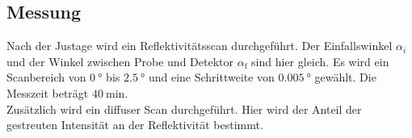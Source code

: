 \documentclass[
  bibliography=totoc,     %
  captions=tableheading,  %
  titlepage=firstiscover, %
]{scrartcl}
\begin{document}
\subsection{Messung}

Nach der Justage wird ein Reflektivitätsscan durchgeführt. Der Einfallswinkel $\alpha_i$ und der Winkel zwischen Probe 
und Detektor $\alpha_\text{f}$ sind hier gleich. Es wird ein Scanbereich von $\SI{0}{\degree}$ bis $\SI{2.5}{\degree}$ und eine Schrittweite 
von $\SI{0.005}{\degree}$ gewählt. Die Messzeit beträgt $\SI{40}{\minute}$. \\
Zusätzlich wird ein diffuser Scan durchgeführt. Hier wird der Anteil der gestreuten Intensität an der Reflektivität bestimmt.

\newpage 
\printbibliography 
\end{document}

